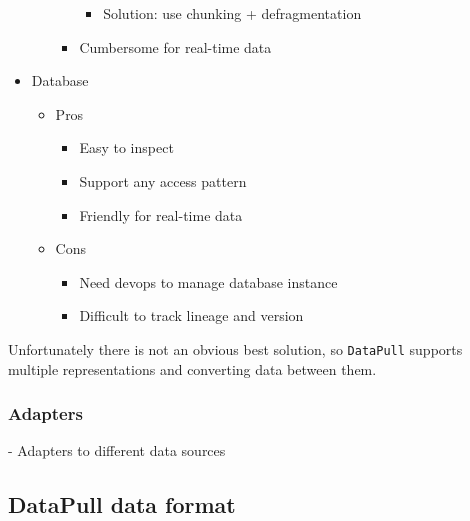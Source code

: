 \documentclass[11pt, reqno]{amsart}
\theoremstyle{definition}
\theoremstyle{remark}
\begin{document}
\begin{itemize}
\begin{itemize}
\begin{itemize}
                        \begin{itemize}
                          \item Solution: use chunking + defragmentation
                        \end{itemize}
                  \item Cumbersome for real-time data
                \end{itemize}
        \end{itemize}

  \item Database
        \begin{itemize}

          \item Pros
                \begin{itemize}
                  \item Easy to inspect
                  \item Support any access pattern
                  \item Friendly for real-time data
                \end{itemize}

          \item Cons
                \begin{itemize}
                  \item Need devops to manage database instance
                  \item Difficult to track lineage and version
                \end{itemize}
        \end{itemize}
\end{itemize}

Unfortunately there is not an obvious best solution, so \verb|DataPull|
supports multiple representations and converting data between them.

\subsubsection{Adapters}

- Adapters to different data sources

\subsection{DataPull data format}
\end{document}
